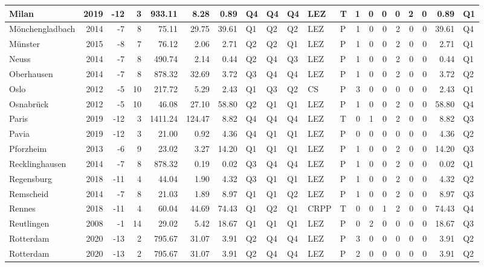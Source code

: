 \begin{tabular}{l|r|r|r|r|r|r|l|l|l|l|l|r|r|r|r|r|r|r|l}
\hline
Milan & 2019 & -12 & 3 & 933.11 & 8.28 & 0.89 & Q4 & Q4 & Q4 & LEZ & T & 1 & 0 & 0 & 0 & 2 & 0 & 0.89 & Q1\\
\hline
Mönchengladbach & 2014 & -7 & 8 & 75.11 & 29.75 & 39.61 & Q1 & Q2 & Q2 & LEZ & P & 1 & 0 & 0 & 2 & 0 & 0 & 39.61 & Q4\\
\hline
Münster & 2015 & -8 & 7 & 76.12 & 2.06 & 2.71 & Q2 & Q2 & Q1 & LEZ & P & 1 & 0 & 0 & 2 & 0 & 0 & 2.71 & Q1\\
\hline
Neuss & 2014 & -7 & 8 & 490.74 & 2.14 & 0.44 & Q2 & Q4 & Q3 & LEZ & P & 1 & 0 & 0 & 2 & 0 & 0 & 0.44 & Q1\\
\hline
Oberhausen & 2014 & -7 & 8 & 878.32 & 32.69 & 3.72 & Q3 & Q4 & Q4 & LEZ & P & 1 & 0 & 0 & 2 & 0 & 0 & 3.72 & Q2\\
\hline
Oslo & 2012 & -5 & 10 & 217.72 & 5.29 & 2.43 & Q1 & Q3 & Q2 & CS & P & 3 & 0 & 0 & 0 & 0 & 0 & 2.43 & Q1\\
\hline
Osnabrück & 2012 & -5 & 10 & 46.08 & 27.10 & 58.80 & Q2 & Q1 & Q1 & LEZ & P & 1 & 0 & 0 & 2 & 0 & 0 & 58.80 & Q4\\
\hline
Paris & 2019 & -12 & 3 & 1411.24 & 124.47 & 8.82 & Q4 & Q4 & Q4 & LEZ & T & 0 & 1 & 0 & 2 & 0 & 0 & 8.82 & Q3\\
\hline
Pavia & 2019 & -12 & 3 & 21.00 & 0.92 & 4.36 & Q4 & Q1 & Q1 & LEZ & P & 0 & 0 & 0 & 0 & 0 & 0 & 4.36 & Q2\\
\hline
Pforzheim & 2013 & -6 & 9 & 23.02 & 3.27 & 14.20 & Q1 & Q1 & Q1 & LEZ & P & 1 & 0 & 0 & 2 & 0 & 0 & 14.20 & Q3\\
\hline
Recklinghausen & 2014 & -7 & 8 & 878.32 & 0.19 & 0.02 & Q3 & Q4 & Q4 & LEZ & P & 1 & 0 & 0 & 2 & 0 & 0 & 0.02 & Q1\\
\hline
Regensburg & 2018 & -11 & 4 & 44.04 & 1.90 & 4.32 & Q3 & Q1 & Q1 & LEZ & P & 1 & 0 & 0 & 2 & 0 & 0 & 4.32 & Q2\\
\hline
Remscheid & 2014 & -7 & 8 & 21.03 & 1.89 & 8.97 & Q1 & Q1 & Q2 & LEZ & P & 1 & 0 & 0 & 2 & 0 & 0 & 8.97 & Q3\\
\hline
Rennes & 2018 & -11 & 4 & 60.04 & 44.69 & 74.43 & Q1 & Q2 & Q1 & CRPP & T & 0 & 0 & 1 & 2 & 0 & 0 & 74.43 & Q4\\
\hline
Reutlingen & 2008 & -1 & 14 & 29.02 & 5.42 & 18.67 & Q1 & Q1 & Q1 & LEZ & P & 0 & 2 & 0 & 0 & 0 & 0 & 18.67 & Q3\\
\hline
Rotterdam & 2020 & -13 & 2 & 795.67 & 31.07 & 3.91 & Q2 & Q4 & Q4 & LEZ & P & 3 & 0 & 0 & 0 & 0 & 0 & 3.91 & Q2\\
\hline
Rotterdam & 2020 & -13 & 2 & 795.67 & 31.07 & 3.91 & Q2 & Q4 & Q4 & LEZ & P & 2 & 0 & 0 & 0 & 0 & 0 & 3.91 & Q2\\

\end{tabular}
